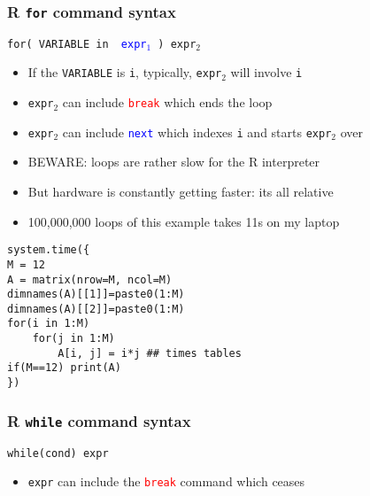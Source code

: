 \documentclass[11pt,pdftex,dvipsnames,usenames,helvetica]{beamer}
\begin{document}
\begin{frame}[fragile]
\frametitle{R {\tt for} command syntax}

{\tt for( VARIABLE in \textcolor{blue}{ expr$_1$ }) expr$_2$}

\begin{itemize}
\item If the {\tt VARIABLE} is {\tt i}, typically, {\tt expr$_2$} will involve {\tt i}
\item {\tt expr$_2$} can include \textcolor{red}{\tt break} 
which ends the loop
\item {\tt expr$_2$} can include \textcolor{blue}{\tt next} 
which indexes {\tt i} and starts {\tt expr$_2$} over
\item BEWARE: loops are rather slow for the R interpreter
\item But hardware is constantly getting faster: its all relative
\item 100,000,000 loops of this example takes 11s on my laptop 
\end{itemize}
\begin{verbatim}
system.time({
M = 12
A = matrix(nrow=M, ncol=M)
dimnames(A)[[1]]=paste0(1:M)
dimnames(A)[[2]]=paste0(1:M)
for(i in 1:M)
    for(j in 1:M)
        A[i, j] = i*j ## times tables
if(M==12) print(A)
})
\end{verbatim}
\end{frame}

\begin{frame}[fragile]
\frametitle{R {\tt while} command syntax}

{\tt while(cond) expr}

\begin{itemize}
\item {\tt expr} can include the \textcolor{red}{\tt break} 
command which ceases
\end{itemize}
\end{frame}
\end{document}
